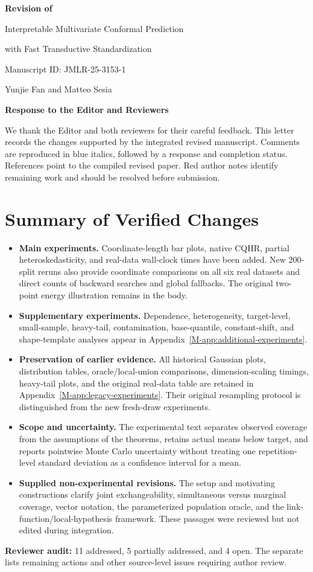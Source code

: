 \documentclass[11pt]{article}
\newcommand{\msapp}[1]{Appendix~\ref*{M-#1}}
\begin{document}
\begin{center}
{\Large\bfseries Revision of\par
Interpretable Multivariate Conformal Prediction\par
with Fast Transductive Standardization\par}
\vspace{0.7em}
Manuscript ID: JMLR-25-3153-1\par
Yunjie Fan and Matteo Sesia\par
\vspace{0.5em}
{\large\bfseries Response to the Editor and Reviewers}
\end{center}
We thank the Editor and both reviewers for their careful feedback. This letter
records the changes supported by the integrated revised manuscript. Comments
are reproduced in blue italics, followed by a response and completion status.
References point to the compiled revised paper. Red author notes identify
remaining work and should be resolved before submission.

\section*{Summary of Verified Changes}
\begin{itemize}
\item \textbf{Main experiments.} Coordinate-length bar plots, native CQHR,
partial heteroskedasticity, and real-data wall-clock times have been added.
New 200-split reruns also provide coordinate comparisons on all six real
datasets and direct counts of backward searches and global fallbacks.
The original two-point energy illustration remains in the body.
\item \textbf{Supplementary experiments.} Dependence, heterogeneity, target-level,
small-sample, heavy-tail, contamination, base-quantile, constant-shift, and
shape-template analyses appear in \msapp{app:additional-experiments}.
\item \textbf{Preservation of earlier evidence.} All historical Gaussian plots,
distribution tables, oracle/local-union comparisons, dimension-scaling timings,
heavy-tail plots, and the original real-data table are retained in
\msapp{app:legacy-experiments}. Their original resampling protocol is
distinguished from the new fresh-draw experiments.
\item \textbf{Scope and uncertainty.} The experimental text separates observed
coverage from the assumptions of the theorems, retains actual means below
target, and reports pointwise Monte Carlo uncertainty without treating one
repetition-level standard deviation as a confidence interval for a mean.
\item \textbf{Supplied non-experimental revisions.} The setup and motivating
constructions clarify joint exchangeability, simultaneous versus marginal
coverage, vector notation, the parameterized population oracle, and the
link-function/local-hypothesis framework. These passages were reviewed but
not edited during integration.
\end{itemize}
\textbf{Reviewer audit:} 11 addressed, 5 partially addressed, and 4 open.
The separate  lists remaining
actions and other source-level issues requiring author review.
\end{document}
